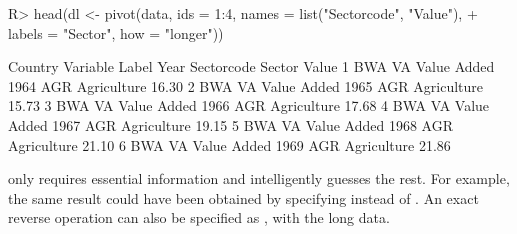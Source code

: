 \documentclass[nojss]{jss} %
\newcommand{\fct}[1]{\code{#1()}}
\begin{document}
\begin{Schunk}
\begin{Sinput}
R> head(dl <- pivot(data, ids = 1:4, names = list("Sectorcode", "Value"),
+                   labels = "Sector", how = "longer"))
\end{Sinput}
\begin{Soutput}
  Country Variable       Label Year Sectorcode      Sector Value
1     BWA       VA Value Added 1964        AGR Agriculture 16.30
2     BWA       VA Value Added 1965        AGR Agriculture 15.73
3     BWA       VA Value Added 1966        AGR Agriculture 17.68
4     BWA       VA Value Added 1967        AGR Agriculture 19.15
5     BWA       VA Value Added 1968        AGR Agriculture 21.10
6     BWA       VA Value Added 1969        AGR Agriculture 21.86
\end{Soutput}
\end{Schunk}
%
\fct{pivot} only requires essential information and intelligently guesses the rest. For example, the same result could have been obtained by specifying  instead of . An exact reverse operation can also be specified as , with  the long data. \newline
\end{document}
